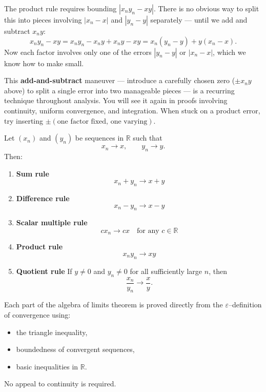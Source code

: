 \begin{remark*}
The product rule requires bounding $|x_n y_n - xy|$.
There is no obvious way to split this into pieces involving $|x_n - x|$
and $|y_n - y|$ separately --- until we add and subtract $x_n y$:
\[
x_n y_n - xy
= x_n y_n - x_n y + x_n y - xy
= x_n(y_n - y) + y(x_n - x).
\]
Now each factor involves only one of the errors $|y_n - y|$ or $|x_n - x|$,
which we know how to make small.

\medskip
This \textbf{add-and-subtract} maneuver --- introduce a carefully chosen
zero ($\pm x_n y$ above) to split a single error into two manageable pieces
--- is a recurring technique throughout analysis.
You will see it again in proofs involving continuity, uniform convergence,
and integration.
When stuck on a product error, try inserting $\pm (\text{one factor fixed,
one varying})$.
\end{remark*}

\begin{theorem}
Let $(x_n)$ and $(y_n)$ be sequences in $\mathbb{R}$ such that
\[
x_n \to x,
\qquad
y_n \to y.
\]
Then:
\begin{enumerate}
\item \textbf{Sum rule}
\[
x_n + y_n \to x + y
\]

\item \textbf{Difference rule}
\[
x_n - y_n \to x - y
\]

\item \textbf{Scalar multiple rule}
\[
c x_n \to c x
\quad \text{for any } c\in\mathbb{R}
\]

\item \textbf{Product rule}
\[
x_n y_n \to xy
\]

\item \textbf{Quotient rule}
If $y\neq 0$ and $y_n\neq 0$ for all sufficiently large $n$, then
\[
\frac{x_n}{y_n} \to \frac{x}{y}.
\]
\end{enumerate}
\end{theorem}

\begin{remark}
Each part of the algebra of limits theorem is proved directly from the
$\varepsilon$–definition of convergence using:
\begin{itemize}
\item the triangle inequality,
\item boundedness of convergent sequences,
\item basic inequalities in $\mathbb{R}$.
\end{itemize}
No appeal to continuity is required.
\end{remark}

